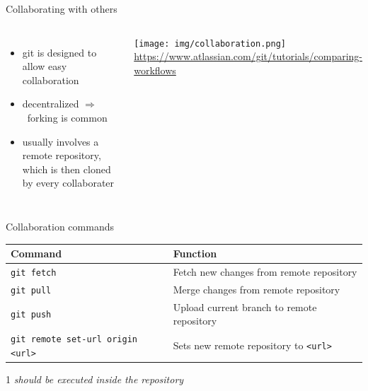 \documentclass[10pt, graphics, aspectratio=169, table]{beamer}
\newcommand{\ra}{$\Rightarrow$\ }
\begin{document}
    \begin{frame}{Collaborating with others}
        \begin{columns}
                \begin{itemize}
                    \item git is designed to allow easy collaboration
                    \item decentralized \ra forking is common
                    \item usually involves a remote repository, which is then cloned by every collaborater
                \end{itemize}
                \center\texttt{[image: img/collaboration.png]}
                \center\tiny\url{https://www.atlassian.com/git/tutorials/comparing-workflows}
        \end{columns}
    \end{frame}

    \begin{frame}{Collaboration commands}
        \begin{table}
            \centering
            \begin{threeparttable}
                \begin{tabular}{ll}
                    \toprule
                    Command & Function \\
                    \midrule
                    \texttt{git fetch} & Fetch new changes from remote repository\tnote{1} \\
                    \texttt{git pull} & Merge changes from remote repository\tnote{1} \\
                    \texttt{git push} & Upload current branch to remote repository\tnote{1} \\
                    \texttt{git remote set-url origin <url>} & Sets new remote repository to \texttt{<url>}\tnote{1} \\
                    \bottomrule
                \end{tabular}
                \begin{tablenotes}
                    \item [1]\emph{should be executed inside the repository}
                \end{tablenotes}
            \end{threeparttable}
        \end{table}
    \end{frame}
\end{document}
